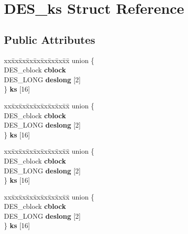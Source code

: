 \hypertarget{structDES__ks}{}\section{D\+E\+S\+\_\+ks Struct Reference}
\label{structDES__ks}
\subsection*{Public Attributes}
\begin{DoxyCompactItemize}
\item 
\mbox{\label{structDES__ks_ae1ba0d8599f990be6f1a7672f8f256e9}} 
\begin{tabbing}
xx\=xx\=xx\=xx\=xx\=xx\=xx\=xx\=xx\=\kill
union \{\\
\>DES\_cblock {\bfseries cblock}\\
\>DES\_LONG {\bfseries deslong} \mbox{[}2\mbox{]}\\
\} {\bfseries ks} \mbox{[}16\mbox{]}\\

\end{tabbing}\item 
\mbox{\label{structDES__ks_a1cdca30f709643f26c44bfe50b630cd2}} 
\begin{tabbing}
xx\=xx\=xx\=xx\=xx\=xx\=xx\=xx\=xx\=\kill
union \{\\
\>DES\_cblock {\bfseries cblock}\\
\>DES\_LONG {\bfseries deslong} \mbox{[}2\mbox{]}\\
\} {\bfseries ks} \mbox{[}16\mbox{]}\\

\end{tabbing}\item 
\mbox{\label{structDES__ks_ad80071f6d6541e1a88b997bfaa86f249}} 
\begin{tabbing}
xx\=xx\=xx\=xx\=xx\=xx\=xx\=xx\=xx\=\kill
union \{\\
\>DES\_cblock {\bfseries cblock}\\
\>DES\_LONG {\bfseries deslong} \mbox{[}2\mbox{]}\\
\} {\bfseries ks} \mbox{[}16\mbox{]}\\

\end{tabbing}\item 
\mbox{\label{structDES__ks_a58133e2b9846f68335798aacbb661b17}} 
\begin{tabbing}
xx\=xx\=xx\=xx\=xx\=xx\=xx\=xx\=xx\=\kill
union \{\\
\>DES\_cblock {\bfseries cblock}\\
\>DES\_LONG {\bfseries deslong} \mbox{[}2\mbox{]}\\
\} {\bfseries ks} \mbox{[}16\mbox{]}\\


\end{tabbing}
\end{DoxyCompactItemize}
